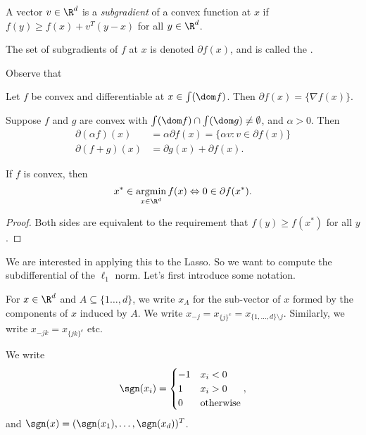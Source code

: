 \documentclass[a4paper]{article}
\DeclareMathOperator*\argmin{argmin}
\begin{document}
\begin{defi}[Subgradient]
  A vector $v \in \R^d$ is a \emph{subgradient} of a convex function at $x$ if $f(y) \geq f(x) + v^T(y - x)$ for all $y \in \R^d$.

  The set of subgradients of $f$ at $x$ is denoted $\partial f(x)$, and is called the .
\end{defi}


Observe that
\begin{prop}
  Let $f$ be convex and differentiable at $x \in \int(\dom f)$. Then $\partial f(x) = \{\nabla f(x)\}$.
\end{prop}

\begin{prop}
  Suppose $f$ and $g$ are convex with $\int(\dom f) \cap \int (\dom g) \not= \emptyset$, and $\alpha > 0$. Then
  \begin{align*}
    \partial (\alpha f)(x) &= \alpha \partial f(x) = \{\alpha v: v \in \partial f(x)\}\\
    \partial (f + g)(x) &= \partial g(x) + \partial f(x).
  \end{align*}
\end{prop}

\begin{prop}
  If $f$ is convex, then
  \[
    x^* \in \argmin_{x \in \R^d} f(x) \Leftrightarrow 0 \in \partial f(x^*).
  \]
\end{prop}

\begin{proof}
  Both sides are equivalent to the requirement that $f(y) \geq f(x^*)$ for all $y$.
\end{proof}

We are interested in applying this to the Lasso. So we want to compute the subdifferential of the $\ell_1$ norm. Let's first introduce some notation.

\begin{notation}
  For $x \in \R^d$ and $A \subseteq \{1 \ldots, d\}$, we write $x_A$ for the sub-vector of $x$ formed by the components of $x$ induced by $A$. We write $x_{-j} = x_{\{j\}^c} = x_{\{1, \ldots, d\} \setminus j}$. Similarly, we write $x_{-jk} = x_{\{jk\}^c}$ etc.

  We write\index{$\sgn$}
  \[
    \sgn(x_i) =
    \begin{cases}
      -1 & x_i < 0\\
      1 & x_i > 0\\
      0 & \text{otherwise}
    \end{cases},
  \]
  and $\sgn(x) = (\sgn(x_1), \ldots, \sgn(x_d))^T$.
\end{notation}
\end{document}
